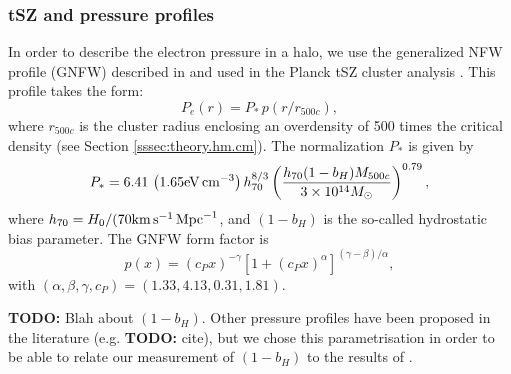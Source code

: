 \documentclass[useAMS,usenatbib]{mn2e}
\newcommand{\TODO}[1]{{\bf TODO:} #1}
\begin{document}
    \subsubsection{tSZ and pressure profiles}\label{sssec:theory.hm.pe}
      In order to describe the electron pressure in a halo, we use the generalized NFW profile (GNFW) described in \cite{2010A&A...517A..92A} and used in the Planck tSZ cluster analysis \cite{2016A&A...594A..24P}. This profile takes the form:
      \begin{equation}
        P_e(r)=P_*\,p(r/r_{500c}),
      \end{equation}
      where $r_{500c}$ is the cluster radius enclosing an overdensity of 500 times the critical density (see Section \ref{sssec:theory.hm.cm}). The normalization $P_*$ is given by
      \begin{equation}
        P_*=6.41\,\left(1.65 {\rm eV}\,{\rm cm}^{-3}\right)h_{70}^{8/3}
        \left(\frac{h_{70}(1-b_H)M_{500c}}{3\times10^{14}M_\odot}\right)^{0.79},
      \end{equation}
      where $h_{70}=H_0/(70 {\rm km}\,{\rm s}^{-1}\,{\rm Mpc}^{-1}$, and $(1-b_H)$ is the so-called hydrostatic bias parameter. The GNFW form factor is
      \begin{equation}
        p(x)=(c_P x)^{-\gamma}\left[1+(c_P x)^\alpha\right]^{(\gamma-\beta)/\alpha},
      \end{equation}
      with $(\alpha,\beta,\gamma,c_P)=(1.33,4.13,0.31,1.81)$.
      
      \TODO{Blah about $(1-b_H)$}. Other pressure profiles have been proposed in the literature (e.g. \TODO{cite}), but we chose this parametrisation in order to be able to relate our measurement of $(1-b_H)$ to the results of \cite{2016A&A...594A..24P}.
      
\end{document}

